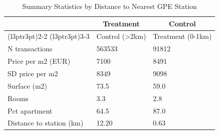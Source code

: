 \begin{table}[!h]
\centering
\caption{\label{tab:tab:summary}Summary Statistics by Distance to Nearest GPE Station}
\centering
\begin{tabular}[t]{lll}
\toprule
\multicolumn{1}{c}{ } & \multicolumn{1}{c}{Treatment} & \multicolumn{1}{c}{Control} \\
\cmidrule(l{3pt}r{3pt}){2-2} \cmidrule(l{3pt}r{3pt}){3-3}
  & Control (>2km) & Treatment (0-1km)\\
\midrule
N transactions & 563533 & 91812\\
Price per m2 (EUR) & 7100 & 8491\\
SD price per m2 & 8349 & 9098\\
Surface (m2) & 73.5 & 59.0\\
Rooms & 3.3 & 2.8\\
\addlinespace
Pct apartment & 64.5 & 87.0\\
Distance to station (km) & 12.20 & 0.63\\
\bottomrule
\end{tabular}
\end{table}
